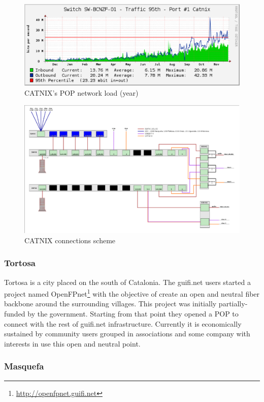 \begin{figure}[htbp]
  \centering
  \includegraphics[scale=.65]{sect3/figures/catnix_network_load_year.eps} 
  \caption{CATNIX's POP network load (year)}
  \label{fig:vic_net_load}
\end{figure}


\begin{figure}[htbp]
  \centering
  \includegraphics[scale=.75]{sect3/figures/telvent_scheme.eps} 
  \caption{CATNIX connections scheme}
  \label{fig:telvent_scheme}
\end{figure}


\subsubsection{Tortosa}
Tortosa is a city placed on the south of Catalonia. The guifi.net users started a project named 
OpenFPnet\footnote{\url{http://openfpnet.guifi.net}} with the objective of create an open and neutral fiber backbone 
around the surrounding villages. This project was initially partially-funded by the government. 
\newline
Starting from that point they opened a POP to connect with the rest of guifi.net infrastructure. 
Currently it is economically sustained by community users grouped in associations and some company with interests in use
this open and neutral point.



\subsubsection{Masquefa}

